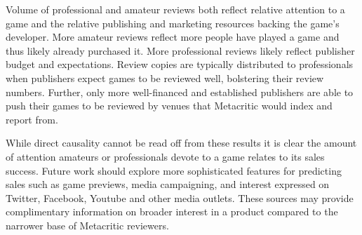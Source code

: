\documentclass{sig-alternate}
\begin{document}


Volume of professional and amateur reviews both reflect relative attention to a game and the relative publishing and marketing resources backing the game's developer. More amateur reviews reflect more people have played a game and thus likely already purchased it.
More professional reviews likely reflect publisher budget and expectations. Review copies are typically distributed to professionals when publishers expect games to be reviewed well, bolstering their review numbers. Further, only more well-financed and established publishers are able to push their games to be reviewed by venues that Metacritic would index and report from.

While direct causality cannot be read off from these results it is clear the amount of attention amateurs or professionals devote to a game relates to its sales success. Future work should explore more sophisticated features for predicting sales such as game previews, media campaigning, and interest expressed on Twitter, Facebook, Youtube and other media outlets. These sources may provide complimentary information on broader interest in a product compared to the narrower base of Metacritic reviewers.
\end{document}
